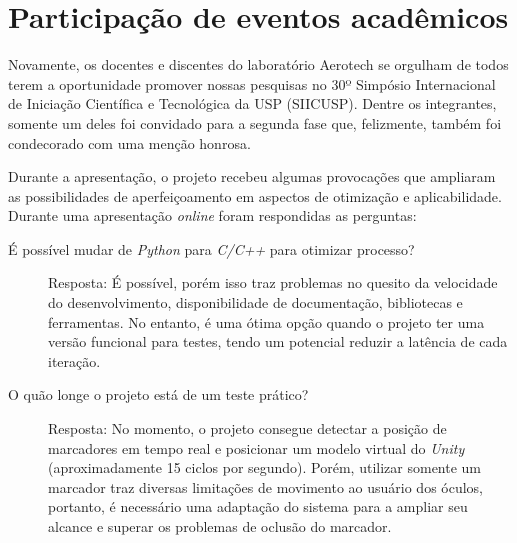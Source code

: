 \chapter{Participação de eventos acadêmicos}\label{chp:disseminacao}

Novamente, os docentes e discentes do laboratório Aerotech se orgulham de todos terem a oportunidade promover nossas pesquisas no 30º Simpósio Internacional de Iniciação Científica e Tecnológica da USP (SIICUSP). Dentre os integrantes, somente um deles foi convidado para a segunda fase que, felizmente, também foi condecorado com uma menção honrosa.

Durante a apresentação, o projeto recebeu algumas provocações que ampliaram as possibilidades de aperfeiçoamento em aspectos de otimização e aplicabilidade. Durante uma apresentação \textit{online} foram respondidas as perguntas:

\begin{description}
    \item[É possível mudar de \textit{Python} para \textit{C/C++} para otimizar processo?] Resposta: É possível, porém isso traz problemas no quesito da velocidade do desenvolvimento, disponibilidade de documentação, bibliotecas e ferramentas. No entanto, é uma ótima opção quando o projeto ter uma versão funcional para testes, tendo um potencial reduzir a latência de cada iteração.
    \item[O quão longe o projeto está de um teste prático?] Resposta: No momento, o projeto consegue detectar a posição de marcadores em tempo real e posicionar um modelo virtual do \textit{Unity} (aproximadamente 15 ciclos por segundo). Porém, utilizar somente um marcador traz diversas limitações de movimento ao usuário dos óculos, portanto, é necessário uma adaptação do sistema para a ampliar seu alcance e superar os problemas de oclusão do marcador.
\end{description}